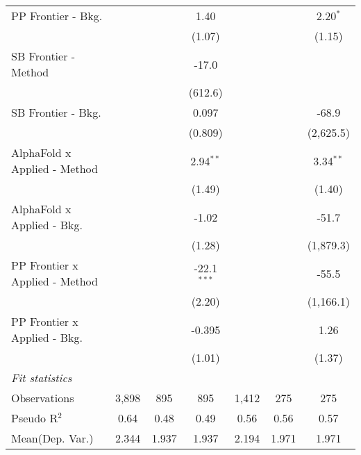 \begin{tabular}{lcccccc}
   PP Frontier - Bkg.             &                &            & 1.40          &                &              & 2.20$^{*}$\\   
                                  &                &            & (1.07)        &                &              & (1.15)\\   
   SB Frontier - Method           &                &            & -17.0         &                &              &   \\   
                                  &                &            & (612.6)       &                &              &   \\   
   SB Frontier - Bkg.             &                &            & 0.097         &                &              & -68.9\\   
                                  &                &            & (0.809)       &                &              & (2,625.5)\\   
   AlphaFold x Applied - Method   &                &            & 2.94$^{**}$   &                &              & 3.34$^{**}$\\   
                                  &                &            & (1.49)        &                &              & (1.40)\\   
   AlphaFold x Applied - Bkg.     &                &            & -1.02         &                &              & -51.7\\   
                                  &                &            & (1.28)        &                &              & (1,879.3)\\   
   PP Frontier x Applied - Method &                &            & -22.1$^{***}$ &                &              & -55.5\\   
                                  &                &            & (2.20)        &                &              & (1,166.1)\\   
   PP Frontier x Applied - Bkg.   &                &            & -0.395        &                &              & 1.26\\   
                                  &                &            & (1.01)        &                &              & (1.37)\\   
   \midrule
   \emph{Fit statistics}\\
   Observations                   & 3,898          & 895        & 895           & 1,412          & 275          & 275\\  
   Pseudo R$^2$                   & 0.64           & 0.48       & 0.49          & 0.56           & 0.56         & 0.57\\  
Mean(Dep. Var.) & 2.344 & 1.937 & 1.937 & 2.194 & 1.971 & 1.971 \\
   

\end{tabular}

